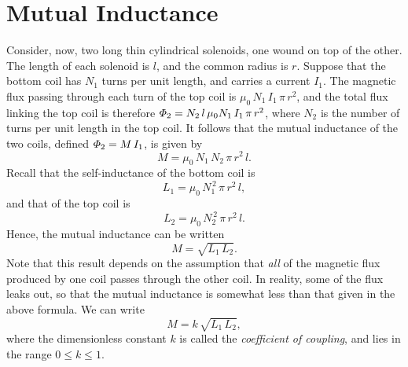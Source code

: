 \section{Mutual Inductance}
Consider, now, two long thin cylindrical solenoids, one wound on top of the other. The length
of each solenoid is $l$, and the common radius is $r$. Suppose that the bottom
coil has $N_1$ turns per unit length, and carries a current $I_1$. The magnetic
flux passing through each turn of the top coil is $\mu_0\, N_1\, I_1\,\pi \,r^2$, and
the total flux linking the top coil is therefore ${\mit\Phi}_2 = N_2 \,l\, \mu_0 N_1\,
I_1\,\pi\, r^2$, where $N_2$ is the number of turns per unit length in the top
coil. It follows that the mutual inductance of the two coils, defined ${\mit\Phi}_2
=M\, I_1$, is given by 
\begin{equation}
M = \mu_0\, N_1\, N_2 \,\pi\, r^2\, l.
\end{equation}
Recall that the self-inductance of the bottom coil is
\begin{equation}
L_1 = \mu_0\, N_1^{\,2} \,\pi \,r^2 \,l,
\end{equation}
and that  of the top coil is
\begin{equation}
L_2 = \mu_0 \,N_2^{\,2} \,\pi \,r^2 \,l.
\end{equation}
Hence, the mutual inductance can be written
\begin{equation}
M = \sqrt{L_1\, L_2}.
\end{equation}
Note that this result depends on the assumption that {\em all}\/ of the magnetic flux produced
by one coil passes through the other coil. In reality, some of the flux
leaks out, so that the mutual inductance is somewhat less than that given in the
above formula. We can write
\begin{equation}\label{e7.25}
M= k \,\sqrt{L_1 \,L_2},
\end{equation}
where the dimensionless constant $k$ is called the {\em coefficient of coupling},
and lies in the range $0\leq k \leq 1$. 

